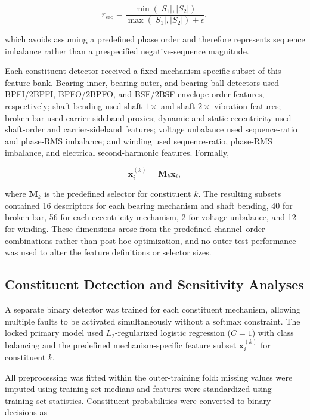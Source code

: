 \documentclass{ieeeaccess}
\begin{document}
\begin{equation}
r_{\mathrm{seq}}
=
\frac{
\min\left(|S_1|,|S_2|\right)
}{
\max\left(|S_1|,|S_2|\right)+\epsilon
},
\label{eq:sequence_ratio}
\end{equation}

which avoids assuming a predefined phase order and therefore represents
sequence imbalance rather than a prespecified negative-sequence magnitude.

Each constituent detector received a fixed mechanism-specific subset of this
feature bank. Bearing-inner, bearing-outer, and bearing-ball detectors used
BPFI/2BPFI, BPFO/2BPFO, and BSF/2BSF envelope-order features, respectively;
shaft bending used shaft-$1\times$ and shaft-$2\times$ vibration features;
broken bar used carrier-sideband proxies; dynamic and static eccentricity used
shaft-order and carrier-sideband features; voltage unbalance used
sequence-ratio and phase-RMS imbalance; and winding used sequence-ratio,
phase-RMS imbalance, and electrical second-harmonic features. Formally,

\begin{equation}
\mathbf{x}^{(k)}_i = \mathbf{M}_k\mathbf{x}_i,
\label{eq:mechanism_feature_map}
\end{equation}

where $\mathbf{M}_k$ is the predefined selector for constituent $k$. The
resulting subsets contained 16 descriptors for each bearing mechanism and
shaft bending, 40 for broken bar, 56 for each eccentricity mechanism, 2 for
voltage unbalance, and 12 for winding. These dimensions arose from the
predefined channel--order combinations rather than post-hoc optimization, and
no outer-test performance was used to alter the feature definitions or
selector sizes.


\subsection{Constituent Detection and Sensitivity Analyses}
\label{subsec:constituent_detection}

A separate binary detector was trained for each constituent mechanism, allowing
multiple faults to be activated simultaneously without a softmax constraint.
The locked primary model used $L_2$-regularized logistic regression
($C=1$) with class balancing and the predefined mechanism-specific feature
subset $\mathbf{x}^{(k)}_i$ for constituent $k$.

All preprocessing was fitted within the outer-training fold: missing values
were imputed using training-set medians and features were standardized using
training-set statistics. Constituent probabilities were converted to binary
decisions as
\end{document}
